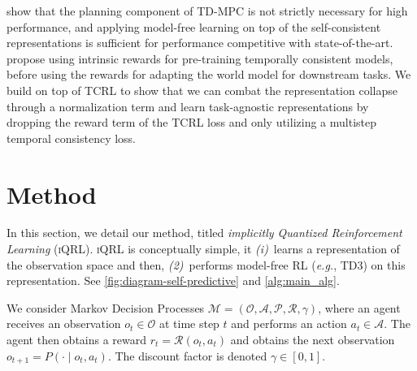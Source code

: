 \documentclass{article}
\makeatletter
\theoremstyle{plain}
\theoremstyle{definition}
\theoremstyle{remark}
\newcommand{\our}{\textsc{iQRL}\xspace}
\newcommand{\eg}{\textit{e.g.\@}\xspace}
\makeatother
\begin{document}
\citet{zhaoSimplifiedTemporalConsistency2023} show that the planning component of TD-MPC is not strictly necessary for high performance, and applying model-free learning on top of the self-consistent representations is sufficient for performance competitive with state-of-the-art. \citet{yuan2022euclid} propose using intrinsic rewards for pre-training temporally consistent models, before using the rewards for adapting the world model for downstream tasks. We build on top of TCRL to show that we can combat the representation collapse through a normalization term and learn task-agnostic representations by dropping the reward term of the TCRL loss and only utilizing a multistep temporal consistency loss.

\section{Method}
\label{sec:method}

In this section, we detail our method, titled \textit{implicitly Quantized Reinforcement Learning} (\our).
\our is conceptually simple, it {\em (i)}~learns a representation of the observation space and then,
{\em (2)}~performs model-free RL (\eg, TD3) on this representation.
See \cref{fig:diagram-self-predictive} and \cref{alg:main_alg}.

We consider Markov Decision Processes \citep[MDPs,][]{bellmanMarkovianDecisionProcess1957a} $\mathcal{M} = (\mathcal{O}, \mathcal{A}, \mathcal{P}, \mathcal{R}, \gamma)$,
where an agent receives an observation $o_{t} \in \mathcal{O}$ at time step $t$ and performs an action $a_{t} \in \mathcal{A}$.
The agent then obtains a reward $r_{t} = \mathcal{R} (o_{t}, a_{t})$ and obtains the next observation
$o_{t+1} = P(\cdot \mid o_{t}, a_{t})$.
The discount factor is denoted $\gamma \in [0, 1]$.
\end{document}
